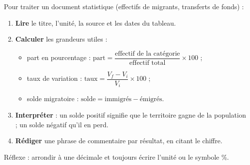 \documentclass[11pt]{article}
\begin{document}
\begin{methode}
Pour traiter un document statistique (effectifs de migrants, transferts de fonds) :
\begin{enumerate}
\item \textbf{Lire} le titre, l'unité, la source et les dates du tableau.
\item \textbf{Calculer} les grandeurs utiles :
\begin{itemize}
\item part en pourcentage : $\text{part} = \dfrac{\text{effectif de la catégorie}}{\text{effectif total}} \times 100$ ;
\item taux de variation : $\text{taux} = \dfrac{V_f - V_i}{V_i} \times 100$ ;
\item solde migratoire : $\text{solde} = \text{immigrés} - \text{émigrés}$.
\end{itemize}
\item \textbf{Interpréter} : un solde positif signifie que le territoire gagne de la population ; un solde négatif qu'il en perd.
\item \textbf{Rédiger} une phrase de commentaire par résultat, en citant le chiffre.
\end{enumerate}
Réflexe : arrondir à une décimale et toujours écrire l'unité ou le symbole \%.
\end{methode}
\end{document}
